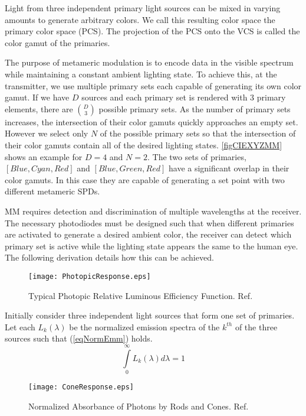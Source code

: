Light from three independent primary light sources can be mixed in varying amounts to generate arbitrary colors. We call this resulting color space the primary color space (PCS). The projection of the PCS onto the VCS is called the color gamut of the primaries.

The purpose of metameric modulation is to encode data in the visible spectrum while maintaining a constant ambient lighting state. To achieve this, at the transmitter, we use multiple primary sets each capable of generating its own color gamut. If we have $D$ sources and each primary set is rendered with $3$ primary elements, there are $\binom{D}{3}$ possible primary sets. As the number of primary sets increases, the intersection of their color gamuts quickly approaches an empty set. However we select only $N$ of the possible primary sets so that the intersection of their color gamuts contain all of the desired lighting states. \figurename{ \ref{figCIEXYZMM}} shows an example for $D=4$ and $N=2$. The two sets of primaries, $[Blue, Cyan, Red]$ and $[Blue, Green, Red]$ have a significant overlap in their color gamuts. In this case they are capable of generating a set point with two different metameric SPDs. 

MM requires detection and discrimination of multiple wavelengths at the receiver. The necessary photodiodes must be designed such that when different primaries are activated to generate a desired ambient color, the receiver can detect which primary set is active while the lighting state appears the same to the human eye. The following derivation details how this can be achieved. 
\begin{figure}
	\centering
    \texttt{[image: PhotopicResponse.eps]}
	\caption{Typical Photopic Relative Luminous Efficiency Function. Ref. \cite{jai89a}}
	\label{figPhotopicCurve}
\end{figure}

Initially consider three independent light sources that form one set of primaries. Let each $L_{k}(\lambda)$ be the normalized emission spectra of the $k^{th}$ of the three sources such that (\ref{eqNormEmm}) holds.
\begin{equation}
	\label{eqNormEmm}
	\int\limits_{0}^{\infty} L_{k}(\lambda)d\lambda = 1
\end{equation}
\begin{figure}
	\centering
    \texttt{[image: ConeResponse.eps]}
	\caption{Normalized Absorbance of Photons by Rods and Cones. Ref. \cite{wan96a}}
	\label{figConeResp}
\end{figure}


